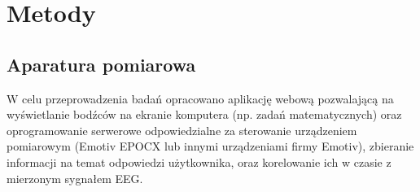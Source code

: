 \documentclass{./assets/wfis}
\begin{document}
\chapter{Metody}

\section{Aparatura pomiarowa}\label{aparatura-pomiarowa}
W celu przeprowadzenia badań opracowano aplikację webową pozwalającą na wyświetlanie bodźców na ekranie komputera (np. zadań matematycznych) oraz oprogramowanie serwerowe odpowiedzialne za sterowanie urządzeniem pomiarowym (Emotiv EPOCX lub innymi urządzeniami firmy Emotiv), zbieranie informacji na temat odpowiedzi użytkownika, oraz korelowanie ich w czasie z mierzonym sygnałem EEG.
\end{document}
